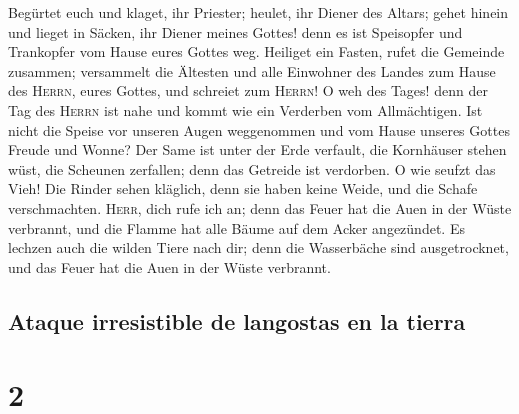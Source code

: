  Begürtet euch und klaget, ihr Priester; heulet, ihr
Diener des Altars; gehet hinein und lieget in Säcken, ihr Diener meines
Gottes! denn es ist Speisopfer und Trankopfer vom Hause eures Gottes
weg.  Heiliget ein Fasten, rufet die Gemeinde zusammen;
versammelt die Ältesten und alle Einwohner des Landes zum Hause des
\textsc{Herrn}, eures Gottes, und schreiet zum \textsc{Herrn}!
 O weh des Tages! denn der Tag des \textsc{Herrn} ist
nahe und kommt wie ein Verderben vom Allmächtigen.  Ist
nicht die Speise vor unseren Augen weggenommen und vom Hause unseres
Gottes Freude und Wonne?  Der Same ist unter der Erde
verfault, die Kornhäuser stehen wüst, die Scheunen zerfallen; denn das
Getreide ist verdorben.  O wie seufzt das Vieh! Die
Rinder sehen kläglich, denn sie haben keine Weide, und die Schafe
verschmachten.  \textsc{Herr}, dich rufe ich an; denn das
Feuer hat die Auen in der Wüste verbrannt, und die Flamme hat alle Bäume
auf dem Acker angezündet.  Es lechzen auch die wilden
Tiere nach dir; denn die Wasserbäche sind ausgetrocknet, und das Feuer
hat die Auen in der Wüste verbrannt.

\hypertarget{ataque-irresistible-de-langostas-en-la-tierra}{%
\subsection{Ataque irresistible de langostas en la
tierra}\label{ataque-irresistible-de-langostas-en-la-tierra}}

\hypertarget{section-1}{%
\section{2}\label{section-1}}

